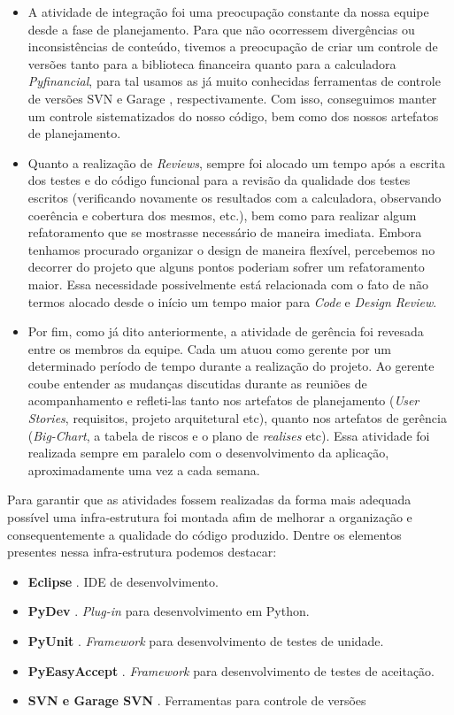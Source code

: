 \begin{itemize}
 \item A atividade de integração foi uma preocupação constante da nossa equipe desde a fase de planejamento. Para que não ocorressem divergências ou inconsistências de conteúdo, tivemos a preocupação de criar um controle de versões tanto para a biblioteca financeira quanto para a calculadora \textit{Pyfinancial}, para tal usamos as já muito conhecidas ferramentas de controle de versões SVN \cite{SVN} e Garage \cite{garage}, respectivamente. Com isso, conseguimos manter um controle sistematizados do nosso código, bem como dos nossos artefatos de planejamento.
 \item Quanto a realização de \textit{Reviews}, sempre foi alocado um tempo após a escrita dos testes e do código funcional para a revisão da qualidade dos testes escritos (verificando novamente os resultados com a calculadora, observando coerência e cobertura dos mesmos, etc.), bem como para realizar algum refatoramento que se mostrasse necessário de maneira imediata. Embora tenhamos procurado organizar o design de maneira flexível, percebemos no decorrer do projeto que alguns pontos poderiam sofrer um refatoramento maior. Essa necessidade possivelmente está relacionada com o fato de não termos alocado desde o início um tempo maior para \textit{Code} e \textit{Design Review}.
 \item Por fim, como já dito anteriormente, a atividade de gerência foi revesada entre os membros da equipe. Cada um atuou como gerente por um determinado período de tempo durante a realização do projeto. Ao gerente coube entender as mudanças discutidas durante as reuniões de acompanhamento e refleti-las tanto nos artefatos de planejamento (\textit{User Stories}, requisitos, projeto arquitetural etc), quanto nos artefatos de gerência (\textit{Big-Chart}, a tabela de riscos  e o plano de \textit{realises} etc). Essa atividade foi realizada sempre em paralelo com o desenvolvimento da aplicação, aproximadamente uma vez a cada semana.
 
\end{itemize}

Para garantir que as atividades fossem realizadas da forma mais adequada possível uma infra-estrutura foi montada afim de melhorar a organização e consequentemente a qualidade do código produzido. Dentre os elementos presentes nessa infra-estrutura podemos destacar:

\begin{itemize}
 \item \textbf{Eclipse} \cite{eclipse}. IDE de desenvolvimento.
 \item \textbf{PyDev} \cite{pydev}. \textit{Plug-in} para desenvolvimento em Python.
 \item \textbf{PyUnit} \cite{pyunit}. \textit{Framework} para desenvolvimento de testes de unidade.
 \item \textbf{PyEasyAccept} \cite{pyeasyaccept}. \textit{Framework} para desenvolvimento de testes de aceitação.
 \item \textbf{SVN e Garage SVN} \cite{SVN}\cite{garage}. Ferramentas para controle de versões
\end{itemize}





